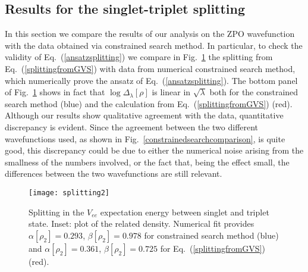 \documentclass[aps,pra,twocolumn,superscriptaddress]{revtex4}
\begin{document}
\subsection{Results for the singlet-triplet splitting}
\label{results}
In this section we compare the results of our analysis on the ZPO wavefunction with the data obtained via constrained search method. In particular, to check the validity of Eq.~(\ref{ansatzsplitting}) we compare in Fig.~\ref{splittingfigure} the splitting from Eq.~(\ref{splittingfromGVS}) with data from numerical constrained search method, which numerically prove the ansatz of Eq.~(\ref{ansatzsplitting}). The bottom panel of Fig.~\ref{splittingfigure} shows in fact that $\log\Delta_{\lambda}[\rho]$ is linear in $\sqrt{\lambda}$ both for the constrained search method (blue) and the calculation from Eq.~(\ref{splittingfromGVS}) (red).
\\Although our results show qualitative agreement with the data, quantitative discrepancy is evident. Since the agreement between the two different wavefunctions used, as shown in Fig.~\ref{constrainedsearchcomparison}, is quite good, this discrepancy could be due to either the numerical noise arising from the smallness of the numbers involved, or the fact that, being the effect small, the differences between the two wavefunctions are still relevant.


\begin{figure}
\texttt{[image: splitting2]}
\caption{\label{splittingfigure} Splitting in the $V_{ee}$ expectation energy between singlet and triplet state. Inset: plot of the related density. Numerical fit provides $\alpha[\rho_2]=0.293$,  $\beta[\rho_2]=0.978$ for constrained search method (blue) and $\alpha[\rho_2]=0.361$, $\beta[\rho_2]=0.725$ for Eq.~(\ref{splittingfromGVS}) (red).}
\end{figure}
\end{document}
